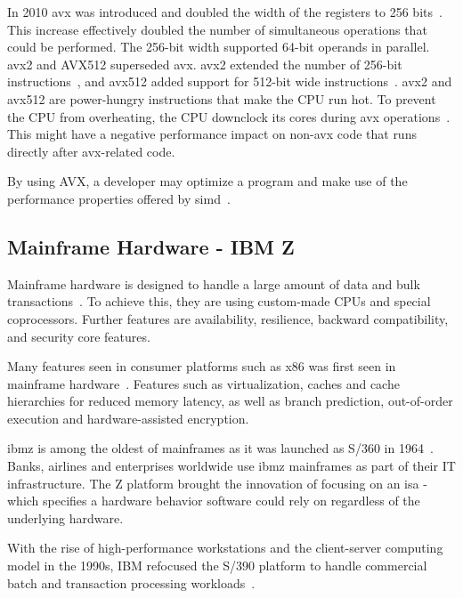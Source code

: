 In 2010 \gls{avx} was introduced and doubled the width of the registers to 256 bits~\cite{hennessy2011:avx, intel:avx}. This increase effectively doubled the number of simultaneous operations that could be performed. The 256-bit width supported 64-bit operands in parallel. \gls{avx2} and AVX512 superseded \gls{avx}. \gls{avx2} extended the number of 256-bit instructions~\cite{intel:manual:2020}, and \gls{avx512} added support for 512-bit wide instructions~\cite{intel:avx512}. \gls{avx2} and \gls{avx512} are power-hungry instructions that make the CPU run hot. To prevent the CPU from overheating, the CPU downclock its cores during \gls{avx} operations~\cite{hackenberg2015, intel:manual:2020}. This might have a negative performance impact on non-\gls{avx} code that runs directly after \gls{avx}-related code.

By using AVX, a developer may optimize a program and make use of the performance properties offered by \gls{simd}~\cite{hennessy2011:avx}.

\subsection{Mainframe Hardware - IBM Z}

Mainframe hardware is designed to handle a large amount of data and bulk transactions~\cite{mainframes}. To achieve this, they are using custom-made CPUs and special coprocessors. Further features are availability, resilience, backward compatibility, and security core features.

Many features seen in consumer platforms such as \gls{x86} was first seen in mainframe hardware~\cite{jacobi2020}. Features such as virtualization, caches and cache hierarchies for reduced memory latency, as well as branch prediction, out-of-order execution and hardware-assisted encryption.

\gls{ibmz} is among the oldest of mainframes as it was launched as S/360 in 1964~\cite{jacobi2020}. Banks, airlines and enterprises worldwide use \gls{ibmz} mainframes as part of their IT infrastructure. The Z platform brought the innovation of focusing on an \acrfull{isa} - which specifies a hardware behavior software could rely on regardless of the underlying hardware.

With the rise of high-performance workstations and the client-server computing model in the 1990s, IBM refocused the S/390 platform to handle commercial batch and transaction processing workloads~\cite{jacobi2020}. 

